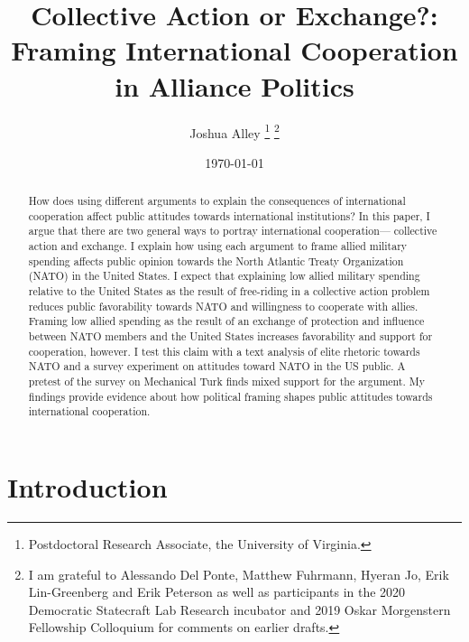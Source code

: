 \documentclass[12pt]{article}
\title{\textbf{Collective Action or Exchange?: Framing International Cooperation in Alliance Politics}}
\author{Joshua Alley
\footnote{Postdoctoral Research Associate, the University of Virginia.}
\footnote{I am grateful to Alessando Del Ponte, Matthew Fuhrmann, Hyeran Jo, Erik Lin-Greenberg and Erik Peterson as well as participants in the 2020 Democratic Statecraft Lab Research incubator and 2019 Oskar Morgenstern Fellowship Colloquium for comments on earlier drafts.}}
\date{\today}
\begin{document}
\maketitle 

\doublespace 

\begin{abstract}
How does using different arguments to explain the consequences of international cooperation affect public attitudes towards international institutions? 
In this paper, I argue that there are two general ways to portray international cooperation--- collective action and exchange. 
I explain how using each argument to frame allied military spending affects public opinion towards the North Atlantic Treaty Organization (NATO) in the United States. 
I expect that explaining low allied military spending relative to the United States as the result of free-riding in a collective action problem reduces public favorability towards NATO and willingness to cooperate with allies. 
Framing low allied spending as the result of an exchange of protection and influence between NATO members and the United States increases favorability and support for cooperation, however. 
I test this claim with a text analysis of elite rhetoric towards NATO and a survey experiment on attitudes toward NATO in the US public. 
A pretest of the survey on Mechanical Turk finds mixed support for the argument. 
My findings provide evidence about how political framing shapes public attitudes towards international cooperation. 
\end{abstract}


\newpage 


\section{Introduction}
\end{document}
